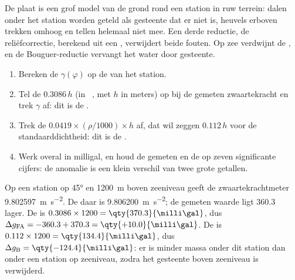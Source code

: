 De plaat is een grof model van de grond rond een station in ruw terrein: dalen onder het station worden geteld als gesteente dat er niet is, heuvels erboven trekken omhoog en tellen helemaal niet mee. Een derde reductie, de reliëfcorrectie, berekend uit een , verwijdert beide fouten. Op zee verdwijnt de , en de Bouguer-reductie vervangt het water door gesteente.

\begin{method}\label{met:b1:isostasy-gravity:reduction}
\begin{enumerate}
  \item Bereken de  $\gamma(\varphi)$ op de  van het station.
  \item Tel de  $0.3086\,h$ (in \unit{\milli\gal}, met $h$ in meters) op bij de gemeten zwaartekracht en trek $\gamma$ af: dit is de .
  \item Trek de  $0.0419\times(\rho/1000)\times h$ af, dat wil zeggen $0.112\,h$ voor de standaarddichtheid: dit is de .
  \item Werk overal in milligal, en houd de gemeten en de  op zeven significante cijfers: de anomalie is een klein verschil van twee grote getallen.
\end{enumerate}
\end{method}

\begin{example}\label{ex:b1:isostasy-gravity:reduction}
Op een station op  \ang{45} en \qty{1200}{m} boven zeeniveau geeft de zwaartekrachtmeter \qty{9.802597}{m.s^{-2}}. De  daar is \qty{9.806200}{m.s^{-2}}; de gemeten waarde ligt \qty{360.3}{\milli\gal} lager. De  is $0.3086\times1200 = \qty{370.3}{\milli\gal}$, dus $\Delta g_{\mathrm{FA}} = -360.3 + 370.3 = \qty{+10.0}{\milli\gal}$. De  is $0.112\times1200 = \qty{134.4}{\milli\gal}$, dus $\Delta g_{\mathrm B}
= \qty{-124.4}{\milli\gal}$: er is minder massa onder dit station dan onder een station op zeeniveau, zodra het gesteente boven zeeniveau is verwijderd.
\end{example}

